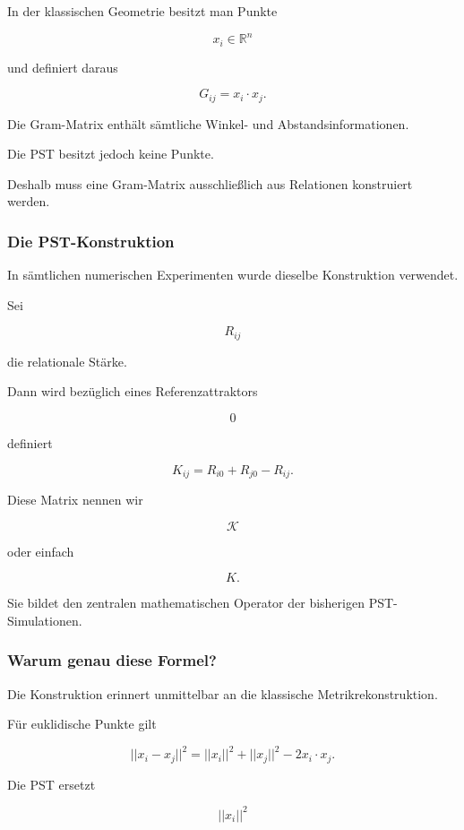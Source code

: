 In der klassischen Geometrie besitzt man Punkte

\[
x_i\in\mathbb R^n
\]

und definiert daraus

\[
G_{ij}=x_i\cdot x_j.
\]

Die Gram-Matrix enthält sämtliche Winkel- und Abstandsinformationen.

Die PST besitzt jedoch keine Punkte.

Deshalb muss eine Gram-Matrix ausschließlich aus Relationen konstruiert werden.


\subsubsection*{Die PST-Konstruktion}

In sämtlichen numerischen Experimenten wurde dieselbe Konstruktion verwendet.

Sei

\[
R_{ij}
\]

die relationale Stärke.

Dann wird bezüglich eines Referenzattraktors

\[
0
\]

definiert

\[
\boxed{
K_{ij}
=
R_{i0}
+
R_{j0}
-
R_{ij}.
}
\]

Diese Matrix nennen wir

\[
\boxed{\mathcal K}
\]

oder einfach

\[
K.
\]

Sie bildet den zentralen mathematischen Operator der bisherigen PST-Simulationen.


\subsubsection*{Warum genau diese Formel?}

Die Konstruktion erinnert unmittelbar an die klassische Metrikrekonstruktion.

Für euklidische Punkte gilt

\[
||x_i-x_j||^2
=
||x_i||^2
+
||x_j||^2
-
2x_i\cdot x_j.
\]

Die PST ersetzt

\[
||x_i||^2
\]

